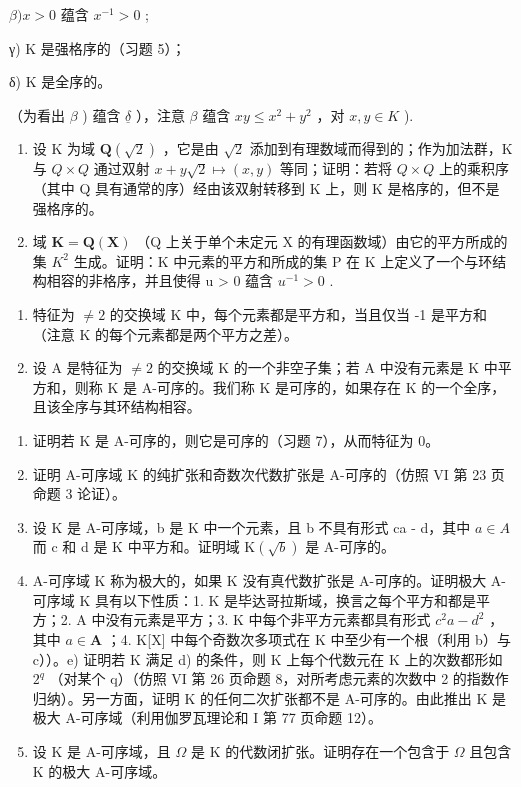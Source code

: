 \(\beta) x > 0\) 蕴含 \(x^{-1} > 0\) ;

γ) K 是强格序的（习题 5）；

δ) K 是全序的。

（为看出 \(\beta\) ) 蕴含 \(\underline{\delta}\) ），注意 \(\beta\) 蕴含 \(xy \leqslant x^2 + y^2\) ，对 \(x, y \in K\) ).

\begin{enumerate}
\def\labelenumi{\alph{enumi})}
\setcounter{enumi}{1}
\item
  设 K 为域 \(\mathbf{Q}(\sqrt{2})\) ，它是由 \(\sqrt{2}\) 添加到有理数域而得到的；作为加法群，K 与 \(Q \times Q\) 通过双射 \(x + y \sqrt{2} \mapsto (x, y)\) 等同；证明：若将 \(Q \times Q\) 上的乘积序（其中 Q 具有通常的序）经由该双射转移到 K 上，则 K 是格序的，但不是强格序的。
\item
  域 \(\mathbf{K} = \mathbf{Q}(\mathbf{X})\) （Q 上关于单个未定元 X 的有理函数域）由它的平方所成的集 \(K^{2}\) 生成。证明：K 中元素的平方和所成的集 P 在 K 上定义了一个与环结构相容的非格序，并且使得 u \textgreater{} 0 蕴含 \(u^{-1} > 0\) .
\end{enumerate}

\begin{enumerate}
\def\labelenumi{\arabic{enumi})}
\setcounter{enumi}{6}
\item
  特征为 \(\neq 2\) 的交换域 K 中，每个元素都是平方和，当且仅当 -1 是平方和（注意 K 的每个元素都是两个平方之差）。
\item
  设 A 是特征为 \(\neq 2\) 的交换域 K 的一个非空子集；若 A 中没有元素是 K 中平方和，则称 K 是 A-可序的。我们称 K 是可序的，如果存在 K 的一个全序，且该全序与其环结构相容。
\end{enumerate}

\begin{enumerate}
\def\labelenumi{\alph{enumi})}
\item
  证明若 K 是 A-可序的，则它是可序的（习题 7），从而特征为 0。
\item
  证明 A-可序域 K 的纯扩张和奇数次代数扩张是 A-可序的（仿照 VI 第 23 页命题 3 论证）。
\item
  设 K 是 A-可序域，b 是 K 中一个元素，且 b 不具有形式 ca - d，其中 \(a \in A\) 而 c 和 d 是 K 中平方和。证明域 \(\mathrm{K}(\sqrt{b})\) 是 A-可序的。
\item
  A-可序域 K 称为极大的，如果 K 没有真代数扩张是 A-可序的。证明极大 A-可序域 K 具有以下性质：1. K 是毕达哥拉斯域，换言之每个平方和都是平方；2. A 中没有元素是平方；3. K 中每个非平方元素都具有形式 \(c^2 a - d^2\) ，其中 \(a \in \mathbf{A}\) ；4. K{[}X{]} 中每个奇数次多项式在 K 中至少有一个根（利用 b）与 c））。e) 证明若 K 满足 d) 的条件，则 K 上每个代数元在 K 上的次数都形如 \(2^q\) （对某个 q）（仿照 VI 第 26 页命题 8，对所考虑元素的次数中 2 的指数作归纳）。另一方面，证明 K 的任何二次扩张都不是 A-可序的。由此推出 K 是极大 A-可序域（利用伽罗瓦理论和 I 第 77 页命题 12）。
\item
  设 K 是 A-可序域，且 \(\Omega\) 是 K 的代数闭扩张。证明存在一个包含于 \(\Omega\) 且包含 K 的极大 A-可序域。
\end{enumerate}

